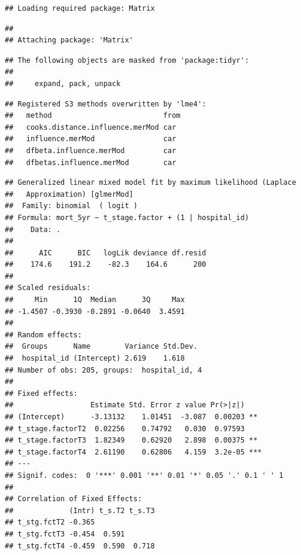 \documentclass[
  12pt,
  krantz2]{krantz}
\makeatletter
\newenvironment{Shaded}{\begin{snugshade}}{\end{snugshade}}
\newcommand{\DataTypeTok}[1]{\textcolor[rgb]{0.13,0.29,0.53}{#1}}
\newcommand{\DecValTok}[1]{\textcolor[rgb]{0.00,0.00,0.81}{#1}}
\newcommand{\KeywordTok}[1]{\textcolor[rgb]{0.13,0.29,0.53}{\textbf{#1}}}
\newcommand{\NormalTok}[1]{#1}
\newcommand{\OperatorTok}[1]{\textcolor[rgb]{0.81,0.36,0.00}{\textbf{#1}}}
\newcommand{\StringTok}[1]{\textcolor[rgb]{0.31,0.60,0.02}{#1}}
\newenvironment{kframe}{%
\medskip{}
\setlength{\fboxsep}{.8em}
 \def\at@end@of@kframe{}%
 \ifinner\ifhmode%
  \def\at@end@of@kframe{\end{minipage}}%
  \begin{minipage}{\columnwidth}%
 \fi\fi%
 \def\FrameCommand##1{\hskip\@totalleftmargin \hskip-\fboxsep
 \colorbox{shadecolor}{##1}\hskip-\fboxsep
     \hskip-\linewidth \hskip-\@totalleftmargin \hskip\columnwidth}%
 \MakeFramed {\advance\hsize-\width
   \@totalleftmargin\z@ \linewidth\hsize
   \@setminipage}}%
 {\par\unskip\endMakeFramed%
 \at@end@of@kframe}
\renewenvironment{Shaded}{\begin{kframe}}{\end{kframe}}
\makeatother
\begin{document}
\begin{verbatim}
## Loading required package: Matrix
\end{verbatim}

\begin{verbatim}
## 
## Attaching package: 'Matrix'
\end{verbatim}

\begin{verbatim}
## The following objects are masked from 'package:tidyr':
## 
##     expand, pack, unpack
\end{verbatim}

\begin{verbatim}
## Registered S3 methods overwritten by 'lme4':
##   method                          from
##   cooks.distance.influence.merMod car 
##   influence.merMod                car 
##   dfbeta.influence.merMod         car 
##   dfbetas.influence.merMod        car
\end{verbatim}

\begin{Shaded}
\end{Shaded}

\begin{verbatim}
## Generalized linear mixed model fit by maximum likelihood (Laplace
##   Approximation) [glmerMod]
##  Family: binomial  ( logit )
## Formula: mort_5yr ~ t_stage.factor + (1 | hospital_id)
##    Data: .
## 
##      AIC      BIC   logLik deviance df.resid 
##    174.6    191.2    -82.3    164.6      200 
## 
## Scaled residuals: 
##     Min      1Q  Median      3Q     Max 
## -1.4507 -0.3930 -0.2891 -0.0640  3.4591 
## 
## Random effects:
##  Groups      Name        Variance Std.Dev.
##  hospital_id (Intercept) 2.619    1.618   
## Number of obs: 205, groups:  hospital_id, 4
## 
## Fixed effects:
##                  Estimate Std. Error z value Pr(>|z|)    
## (Intercept)      -3.13132    1.01451  -3.087  0.00203 ** 
## t_stage.factorT2  0.02256    0.74792   0.030  0.97593    
## t_stage.factorT3  1.82349    0.62920   2.898  0.00375 ** 
## t_stage.factorT4  2.61190    0.62806   4.159  3.2e-05 ***
## ---
## Signif. codes:  0 '***' 0.001 '**' 0.01 '*' 0.05 '.' 0.1 ' ' 1
## 
## Correlation of Fixed Effects:
##             (Intr) t_s.T2 t_s.T3
## t_stg.fctT2 -0.365              
## t_stg.fctT3 -0.454  0.591       
## t_stg.fctT4 -0.459  0.590  0.718
\end{verbatim}
\end{document}
